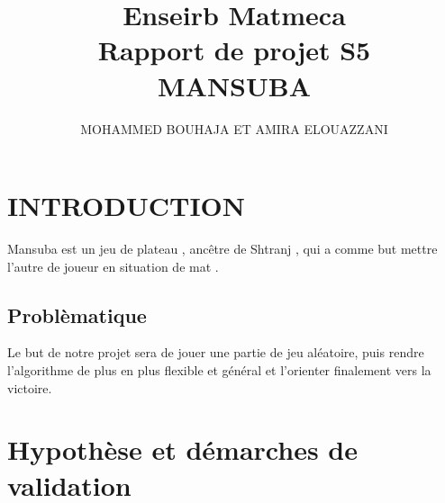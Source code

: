 \documentclass[a4paper]{article}
\begin{document}

\title{ Enseirb Matmeca \\ Rapport de projet S5 \\ MANSUBA }
\author{MOHAMMED BOUHAJA ET AMIRA ELOUAZZANI}
\maketitle





\newpage

\tableofcontents

\newpage

\begin{center}
\end{center}

\section{INTRODUCTION}
Mansuba est un jeu de plateau , ancêtre de Shtranj , qui a comme but mettre l’autre de joueur en situation de mat . 
\subsection{Problèmatique}
Le but de notre projet sera de jouer une partie de jeu aléatoire, puis rendre l'algorithme de plus en plus flexible et général
et l'orienter finalement vers la victoire. 

\section{Hypothèse et démarches de validation}
\end{document}
